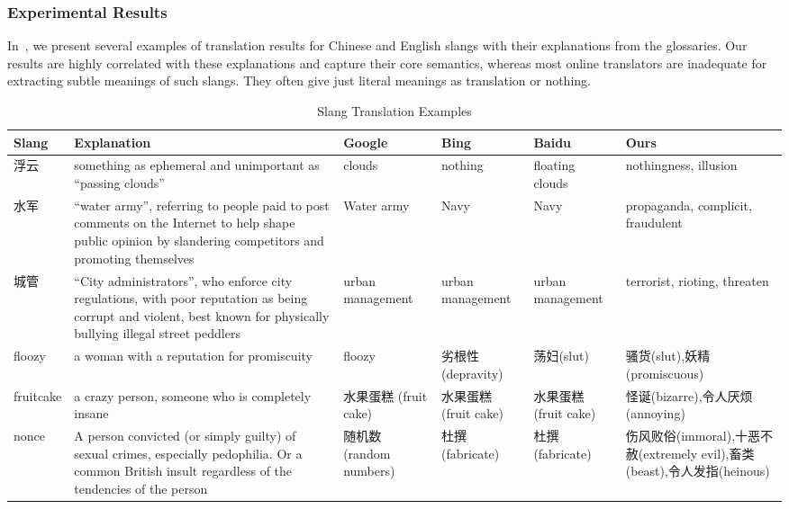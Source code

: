 \subsubsection{Experimental Results}
In~, we present several examples of translation results for Chinese and English slangs with their explanations from the glossaries. Our results are highly correlated with these explanations and capture their core semantics, whereas most online translators are inadequate for extracting subtle meanings of such slangs. They often give just literal meanings as translation or nothing.
\begin{table*}[th]
	\footnotesize
	\centering
	\caption{\small Slang Translation Examples}
	\begin{tabular}{|L{1.2cm}|L{6.1cm}|L{1.7cm}|L{1.7cm}|L{1.7cm}|L{3cm}|}
		\hline
		\textbf{Slang} & \textbf{Explanation} & \textbf{Google}& \textbf{Bing}& \textbf{Baidu} & \textbf{Ours} \\ \hline \hline
		浮云 &something as ephemeral and unimportant as ``passing clouds''& clouds& nothing& floating clouds & nothingness, illusion \\ \hline
		水军 &``water army'', referring to people paid to post comments on the Internet to help shape public opinion by slandering competitors and promoting themselves & Water army& Navy& Navy & propaganda, complicit, fraudulent\\ \hline
		城管 & ``City administrators'', who enforce city regulations, with poor reputation as being corrupt and violent, best known for physically bullying illegal street peddlers & urban management& urban management& urban management & terrorist, rioting, threaten\\ \hline \hline
		floozy & a woman with a reputation for promiscuity & floozy&劣根性 (depravity)&荡妇(slut)&骚货(slut),妖精(promiscuous)\\ \hline
		fruitcake & a crazy person, someone who is completely insane & 水果蛋糕 \quad(fruit cake)&水果蛋糕 \qquad(fruit cake)&水果蛋糕 \quad(fruit cake)& 怪诞(bizarre),令人厌烦(annoying)\\ \hline
		nonce &  A person convicted (or simply guilty) of sexual crimes, especially pedophilia. Or a common British insult regardless of the tendencies of the person &随机数 (random numbers)&杜撰 (fabricate)&杜撰 (fabricate) & 伤风败俗(immoral),十恶不赦(extremely evil),畜类(beast),令人发指(heinous)\\ \hline
	\end{tabular}
	\label{tab:bleis_3}
\end{table*}

